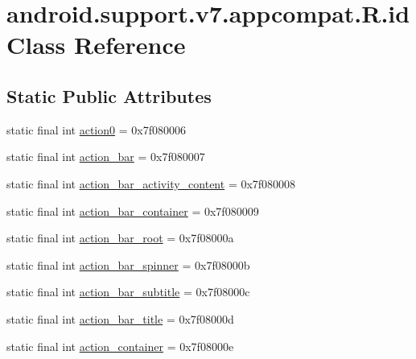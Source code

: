 \hypertarget{classandroid_1_1support_1_1v7_1_1appcompat_1_1R_1_1id}{}\section{android.\+support.\+v7.\+appcompat.\+R.\+id Class Reference}
\label{classandroid_1_1support_1_1v7_1_1appcompat_1_1R_1_1id}
\subsection*{Static Public Attributes}
\begin{DoxyCompactItemize}
\item 
static final int \mbox{\hyperlink{classandroid_1_1support_1_1v7_1_1appcompat_1_1R_1_1id_a2c658ecf3cb7a212407850bf58715caa}{action0}} = 0x7f080006
\item 
static final int \mbox{\hyperlink{classandroid_1_1support_1_1v7_1_1appcompat_1_1R_1_1id_a6c9c8b18c3b57617cf60a9b1ad51f2f1}{action\+\_\+bar}} = 0x7f080007
\item 
static final int \mbox{\hyperlink{classandroid_1_1support_1_1v7_1_1appcompat_1_1R_1_1id_a9ed5ea10a253071eaefa58062f541097}{action\+\_\+bar\+\_\+activity\+\_\+content}} = 0x7f080008
\item 
static final int \mbox{\hyperlink{classandroid_1_1support_1_1v7_1_1appcompat_1_1R_1_1id_a4e19d90e373b2bdb18641e8820c0d7a3}{action\+\_\+bar\+\_\+container}} = 0x7f080009
\item 
static final int \mbox{\hyperlink{classandroid_1_1support_1_1v7_1_1appcompat_1_1R_1_1id_afbd1bfdb4a6c3f4fe61c7d6f8d0b6f45}{action\+\_\+bar\+\_\+root}} = 0x7f08000a
\item 
static final int \mbox{\hyperlink{classandroid_1_1support_1_1v7_1_1appcompat_1_1R_1_1id_ae703f67eed43afe20bafdd104fc16078}{action\+\_\+bar\+\_\+spinner}} = 0x7f08000b
\item 
static final int \mbox{\hyperlink{classandroid_1_1support_1_1v7_1_1appcompat_1_1R_1_1id_ac071fd37a9fcb4d4f8f4179f7d722e40}{action\+\_\+bar\+\_\+subtitle}} = 0x7f08000c
\item 
static final int \mbox{\hyperlink{classandroid_1_1support_1_1v7_1_1appcompat_1_1R_1_1id_a30bf2ad178d05c2a1633b54e55ed8e8a}{action\+\_\+bar\+\_\+title}} = 0x7f08000d
\item 
static final int \mbox{\hyperlink{classandroid_1_1support_1_1v7_1_1appcompat_1_1R_1_1id_a9aeff32bca1e4d867b950a4aca00f344}{action\+\_\+container}} = 0x7f08000e

\end{DoxyCompactItemize}
